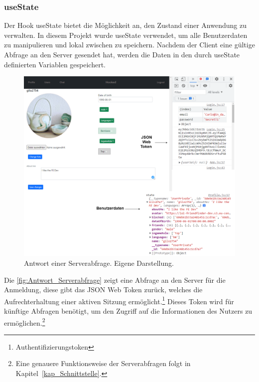 \subsubsection*{useState}
Der Hook useState bietet die Möglichkeit an, den Zustand einer Anwendung zu verwalten. In diesem Projekt wurde useState verwendet, um alle Benutzerdaten zu manipulieren und lokal zwischen zu speichern. Nachdem der Client eine gültige Abfrage an den Server gesendet hat, werden die Daten in den durch useState definierten Variablen gespeichert.
\begin{figure}[h!]
  \centering
  \includegraphics[scale=0.35]{sources/Server-Abfrage-Antwort}
  \caption{Antwort einer Serverabfrage. Eigene Darstellung.}
  \label{fig:Antwort_Serverabfrage} 
\end{figure}
Die \autoref{fig:Antwort_Serverabfrage} zeigt eine Abfrage an den Server für die Anmeldung, diese gibt das JSON Web Token zurück, welches die Aufrechterhaltung einer aktiven Sitzung ermöglicht.\footnote{Authentifizierungstoken\cite{be:rfc7519}} Dieses Token wird für künftige Abfragen benötigt, um den Zugriff auf die Informationen des Nutzers zu ermöglichen.\footnote{Eine genauere Funktionsweise der Serverabfragen folgt in Kapitel~\ref{kap_Schnittstelle}.}
